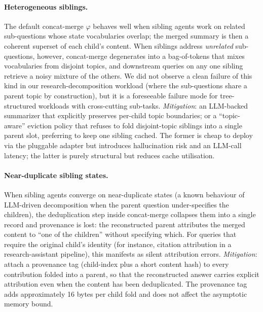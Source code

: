 \documentclass[fleqn,10pt]{article}
\theoremstyle{definition}
\newcommand{\summarize}{\varphi}
\begin{document}
\paragraph{Heterogeneous siblings.}
The default concat-merge $\summarize$ behaves well when sibling
agents work on related sub-questions whose state vocabularies
overlap; the merged summary is then a coherent superset of each
child's content. When siblings address \emph{unrelated}
sub-questions, however, concat-merge degenerates into a
bag-of-tokens that mixes vocabularies from disjoint topics, and
downstream queries on any one sibling retrieve a noisy mixture of
the others. We did not observe a clean failure of this kind in our
research-decomposition workload (where the sub-questions share a
parent topic by construction), but it is a foreseeable failure mode
for tree-structured workloads with cross-cutting sub-tasks.
\emph{Mitigation}: an LLM-backed summarizer that explicitly
preserves per-child topic boundaries; or a ``topic-aware'' eviction
policy that refuses to fold disjoint-topic siblings into a single
parent slot, preferring to keep one sibling cached. The former is
cheap to deploy via the pluggable adapter but introduces
hallucination risk and an LLM-call latency; the latter is purely
structural but reduces cache utilisation.

\paragraph{Near-duplicate sibling states.}
When sibling agents converge on near-duplicate states (a known
behaviour of LLM-driven decomposition when the parent question
under-specifies the children), the deduplication step inside
concat-merge collapses them into a single record and provenance is
lost: the reconstructed parent attributes the merged content to
``one of the children'' without specifying which. For queries that
require the original child's identity (for instance, citation
attribution in a research-assistant pipeline), this manifests as
silent attribution errors. \emph{Mitigation}: attach a provenance
tag (child-index plus a short content hash) to every contribution
folded into a parent, so that the reconstructed answer carries
explicit attribution even when the content has been deduplicated.
The provenance tag adds approximately 16 bytes per child fold and
does not affect the asymptotic memory bound.

\end{document}
